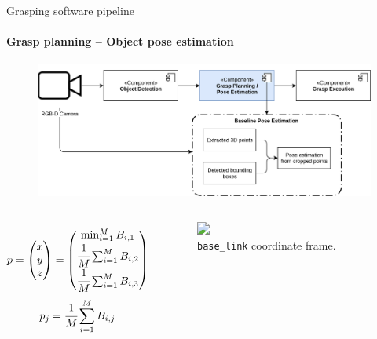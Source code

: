 \documentclass{beamer}
\begin{document}
\begin{frame}{Grasping software pipeline}
    \framesubtitle{Grasp planning -- Object pose estimation}
    \begin{figure}[b]
        \centering
        \includegraphics[width=0.7\linewidth]{grasp_pipeline_pose_estimation}
    \end{figure}
    \begin{columns}[onlytextwidth]
        \scriptsize
        \begin{equation} \label{eq:pose_estimation_min}
        p = \left( \begin{matrix} x \\ y \\ z \end{matrix} \right) =
            \left( \begin{matrix}
                \min_{i = 1}^M B_{i,1} \\
                \cfrac{1}{M} \sum_{i = 1}^{M} B_{i,2} \\
                \cfrac{1}{M} \sum_{i = 1}^{M} B_{i,3}
            \end{matrix} \right)
        \end{equation}
        \begin{equation} \label{eq:pose_estimation_mean}
            p_j = \cfrac{1}{M} \sum_{i = 1}^{M} B_{i,j}
        \end{equation}
        \normalsize
        \begin{figure}[b]
            \includegraphics<1->[width=0.7\textwidth]{base_link_frame}
            \caption{\texttt{base\_link} coordinate frame.}
        \end{figure}
    \end{columns}
\end{frame}
\end{document}
